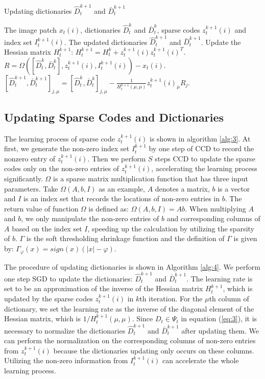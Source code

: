\documentclass[10pt,twocolumn,letterpaper]{article}
\begin{document}
\begin{algorithm}[t]
\caption{Updating dictionaries $\hat{D}^{k+1}_t$ and $\bar{D}^{k+1}_t$}
\begin{algorithmic}[1]
   \Require The image patch $x_t(i)$, dictionaries $\hat{D}^k_t$ and $\bar{D}^k_t$, sparse codes $z_t^{k+1}(i)$ and index set $I_t^{k+1}(i)$.
   \Ensure The updated dictionaries $\hat{D}^{k+1}_t$ and $\bar{D}^{k+1}_t$.
   \State  Update the Hessian matrix $H_t^{k+1}$: $H_t^{k+1} = H_t^k+ z_t^{k+1}(i) z_t^{k+1}(i)^T$.
   \State   $R =  \Omega( [ \hat{D}^k_t, \bar{D}^k_t], z_t^{k+1}(i), I_t^{k+1}(i) )-x_t(i)$.
   \State\quad   $[\hat{D}^{k+1}_t,\bar{D}^{k+1}_t]_{j, \mu} = [\hat{D}^k_t,\bar{D}^k_t]_{j, \mu} - \frac{1}{H_t^{k+1}(\mu, \mu)} z_t^{k+1}(i)_{\mu} R_j$.
   \EndFor
   \EndFor
\end{algorithmic}
\label{alg:4}
\end{algorithm}

\subsection{Updating Sparse Codes and Dictionaries}
The learning process of sparse code $z_t^{k+1}(i)$ is shown in algorithm \ref{alg:3}. At first, we generate the non-zero index set $I_t^{k+1}$ by one step of CCD to record the nonzero entry of $z_t^{k+1}(i)$. Then we perform $S$ steps CCD to update the sparse codes only on the non-zero entries of $z_t^{k+1}(i)$, accelerating the learning process significantly. $\Omega$ is a sparse matrix multiplication function that has three input parameters. Take $\Omega (A, b, I)$ as an example, $A$ denotes a matrix, $b$ is a vector and $I$ is an index set that records the locations of non-zero entries in $b$. The return value of function $\Omega$ is defined as: $\Omega (A, b, I)=Ab$. When multiplying $A$ and $b$, we only manipulate the non-zero entries of $b$ and corresponding columns of $A$ based on the index set $I$, speeding up the calculation by utilizing the sparsity of $b$. $\Gamma$ is the soft thresholding shrinkage function \cite{combettes2005signal} and the definition of $\Gamma$ is  given by: $\Gamma_{\varphi}(x)=sign(x)(|x|-\varphi)$.

The procedure of updating dictionaries is shown in Algorithm \ref{alg:4}. We perform one step SGD to update the dictionaries: $\hat{D}^{k+1}_t$ and $\bar{D}^{k+1}_t$. The learning rate is set to be an approximation of the inverse of the Hessian matrix $H_t^{k+1}$, which is updated by the sparse codes $z_t^{k+1}(i)$ in $k$th iteration. For the $\mu$th column of dictionary, we set the learning rate as the inverse of the diagonal element of the Hessian matrix, which is $1/H_t^{k+1}(\mu, \mu)$. Since $D_t \in \Psi_t$ in equation (\ref{eq:3}), it is necessary to normalize the dictionaries $\hat{D}^{k+1}_t$ and $\bar{D}^{k+1}_t$ after updating them. We can perform the normalization on the corresponding columns of non-zero entries from $z_t^{k+1}(i)$ because the dictionaries updating only occurs on these columns. Utilizing the non-zero information from $I_t^{k+1}(i)$ can accelerate the whole learning process.
\end{document}
